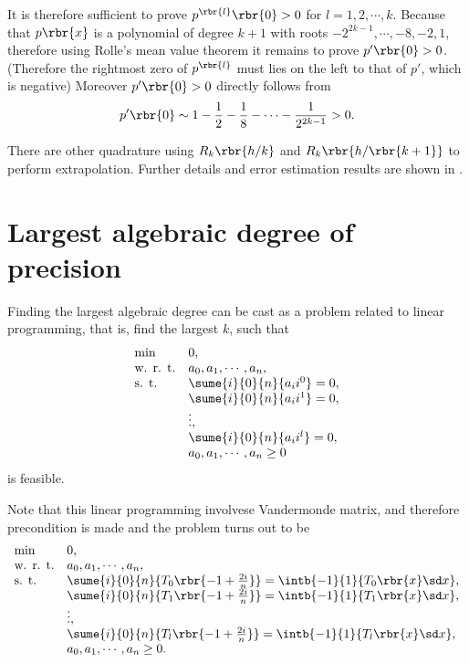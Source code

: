 \documentclass[english, nochinese]{../textmpls/pkupaper}
\begin{document}
It is therefore sufficient to prove $ p^{\rbr{l}} \rbr{0} > 0 $ for $ l = 1, 2, \cdots, k $. Because that $ p \rbr{x} $ is a polynomial of degree $ k + 1 $ with roots $ -2^{ 2 k - 1 }, \cdots, -8, -2, 1 $, therefore using Rolle's mean value theorem it remains to prove $ p' \rbr{0} > 0 $. (Therefore the rightmost zero of $p^{\rbr{l}}$ must lies on the left to that of $p'$, which is negative) Moreover $ p' \rbr{0} > 0 $ directly follows from
\begin{equation}
p' \rbr{0} \sim 1 - \frac{1}{2} - \frac{1}{8} - \cdots - \frac{1}{2^{ 2 k - 1 }} > 0.
\end{equation}

\sqed

There are other quadrature using $ R_k \rbr{ h / k } $ and $ R_k \rbr{ h / \rbr{ k + 1 } } $ to perform extrapolation. Further details and error estimation results are shown in \parencite{havie_error_1972} \parencite{havie_romberg_1977}.

\section{Largest algebraic degree of precision}

Finding the largest algebraic degree can be cast as a problem related to linear programming, that is, find the largest $k$, such that
\begin{equation} \label{Eq:Orig}
\begin{array}{ll}
\text{min} & 0, \\
\text{w. r. t.} & a_0, a_1, \cdots, a_n, \\
\text{s. t.} & \sume{i}{0}{n}{ a_i i^0 } = 0, \\
& \sume{i}{0}{n}{ a_i i^1 } = 0, \\
& \vdots, \\
& \sume{i}{0}{n}{ a_i i^l } = 0, \\
& a_0, a_1, \cdots, a_n \ge 0
\end{array}
\end{equation}
is feasible.

Note that this linear programming involvese Vandermonde matrix, and therefore precondition is made and the problem turns out to be
\begin{equation}
\begin{array}{ll}
\text{min} & 0, \\
\text{w. r. t.} & a_0, a_1, \cdots, a_n, \\
\text{s. t.} & \sume{i}{0}{n}{ T_0 \rbr{ -1 + \frac{ 2 i }{n} } } = \intb{-1}{1}{ T_0 \rbr{x} \sd x }, \\
& \sume{i}{0}{n}{ T_1 \rbr{ -1 + \frac{ 2 i }{n} } } = \intb{-1}{1}{ T_1 \rbr{x} \sd x }, \\
& \vdots, \\
& \sume{i}{0}{n}{ T_l \rbr{ -1 + \frac{ 2 i }{n} } } = \intb{-1}{1}{ T_l \rbr{x} \sd x }, \\
& a_0, a_1, \cdots, a_n \ge 0.
\end{array}
\end{equation}
\end{document}
